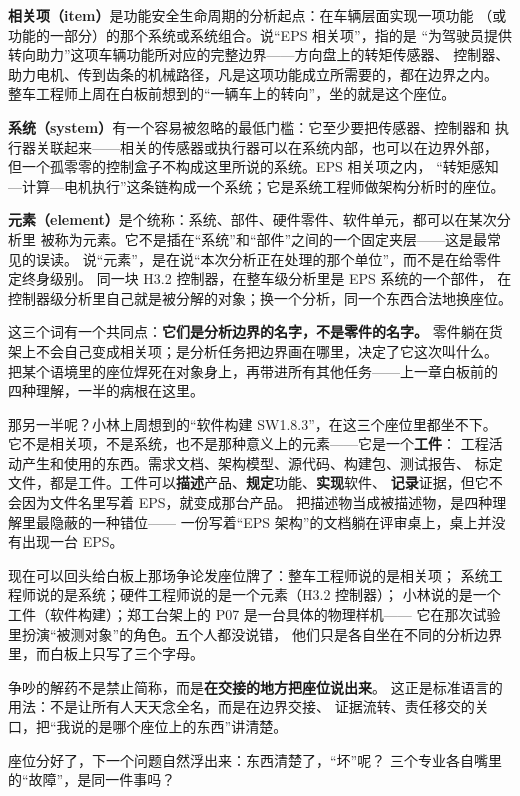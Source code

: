 \textbf{相关项（item）}是功能安全生命周期的分析起点：在车辆层面实现一项功能
（或功能的一部分）的那个系统或系统组合。说“EPS 相关项”，指的是
“为驾驶员提供转向助力”这项车辆功能所对应的完整边界——方向盘上的转矩传感器、
控制器、助力电机、传到齿条的机械路径，凡是这项功能成立所需要的，都在边界之内。
整车工程师上周在白板前想到的“一辆车上的转向”，坐的就是这个座位。

\textbf{系统（system）}有一个容易被忽略的最低门槛：它至少要把传感器、控制器和
执行器关联起来——相关的传感器或执行器可以在系统内部，也可以在边界外部，
但一个孤零零的控制盒子不构成这里所说的系统。EPS 相关项之内，
“转矩感知—计算—电机执行”这条链构成一个系统；它是系统工程师做架构分析时的座位。

\textbf{元素（element）}是个统称：系统、部件、硬件零件、软件单元，都可以在某次分析里
被称为元素。它不是插在“系统”和“部件”之间的一个固定夹层——这是最常见的误读。
说“元素”，是在说“本次分析正在处理的那个单位”，而不是在给零件定终身级别。
同一块 H3.2 控制器，在整车级分析里是 EPS 系统的一个部件，
在控制器级分析里自己就是被分解的对象；换一个分析，同一个东西合法地换座位。

这三个词有一个共同点：\textbf{它们是分析边界的名字，不是零件的名字。}
零件躺在货架上不会自己变成相关项；是分析任务把边界画在哪里，决定了它这次叫什么。
把某个语境里的座位焊死在对象身上，再带进所有其他任务——上一章白板前的
四种理解，一半的病根在这里。

那另一半呢？小林上周想到的“软件构建 SW1.8.3”，在这三个座位里都坐不下。
它不是相关项，不是系统，也不是那种意义上的元素——它是一个\textbf{工件}：
工程活动产生和使用的东西。需求文档、架构模型、源代码、构建包、测试报告、
标定文件，都是工件。工件可以\textbf{描述}产品、\textbf{规定}功能、\textbf{实现}软件、
\textbf{记录}证据，但它不会因为文件名里写着 EPS，就变成那台产品。
把描述物当成被描述物，是四种理解里最隐蔽的一种错位——
一份写着“EPS 架构”的文档躺在评审桌上，桌上并没有出现一台 EPS。

现在可以回头给白板上那场争论发座位牌了：整车工程师说的是相关项；
系统工程师说的是系统；硬件工程师说的是一个元素（H3.2 控制器）；
小林说的是一个工件（软件构建）；郑工台架上的 P07 是一台具体的物理样机——
它在那次试验里扮演“被测对象”的角色。五个人都没说错，
他们只是各自坐在不同的分析边界里，而白板上只写了三个字母。

争吵的解药不是禁止简称，而是\textbf{在交接的地方把座位说出来}。
这正是标准语言的用法：不是让所有人天天念全名，而是在边界交接、
证据流转、责任移交的关口，把“我说的是哪个座位上的东西”讲清楚。

座位分好了，下一个问题自然浮出来：东西清楚了，“坏”呢？
三个专业各自嘴里的“故障”，是同一件事吗？

